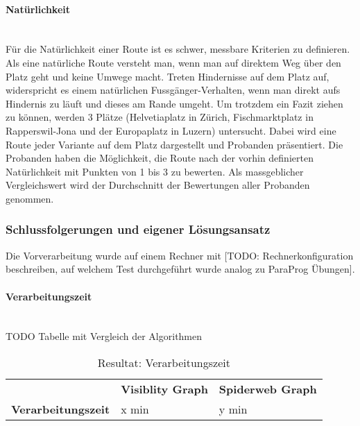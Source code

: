 \paragraph{Natürlichkeit}\label{criteria:Natürlichkeit}~\\
Für die Natürlichkeit einer Route ist es schwer, messbare Kriterien zu definieren. Als eine natürliche Route versteht man, wenn man auf direktem Weg über den Platz geht und keine Umwege macht. Treten Hindernisse auf dem Platz auf, widerspricht es einem natürlichen Fussgänger-Verhalten, wenn man direkt aufs Hindernis zu läuft und dieses am Rande umgeht. Um trotzdem ein Fazit ziehen zu können, werden 3 Plätze (Helvetiaplatz in Zürich, Fischmarktplatz in Rapperswil-Jona und der Europaplatz in Luzern) untersucht. Dabei wird eine Route jeder Variante auf dem Platz dargestellt und Probanden präsentiert. Die Probanden haben die Möglichkeit, die Route nach der vorhin definierten Natürlichkeit mit Punkten von 1 bis 3 zu bewerten. Als massgeblicher Vergleichswert wird der Durchschnitt der Bewertungen aller Probanden genommen.


\subsubsection{Schlussfolgerungen und eigener Lösungsansatz}
\label{sub:Schlussfolgerungen und eigener Lösungsansatz}
Die Vorverarbeitung wurde auf einem Rechner mit [TODO: Rechnerkonfiguration beschreiben, auf welchem Test durchgeführt wurde analog zu ParaProg Übungen]. 

\paragraph{Verarbeitungszeit}\label{result:Verarbeitungszeit}~\\
TODO Tabelle mit Vergleich der Algorithmen
\begin{table}[ht]
    \centering
    \caption{Resultat: Verarbeitungszeit}
    \label{Resultat: Verarbeitungszeit}
    \begin{tabular}{lll}
        & \textbf{Visiblity Graph} & \textbf{Spiderweb Graph} \\
        \textbf{Verarbeitungszeit} & x min                    & y min                   
    \end{tabular}
\end{table}


